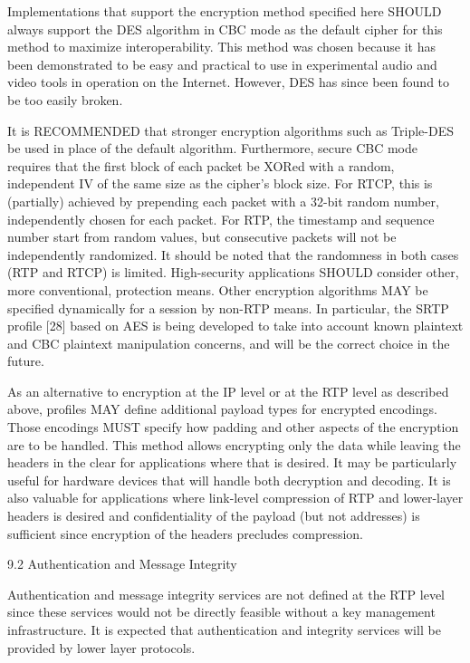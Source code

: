 \documentclass{article}
\begin{document}
Implementations that support the encryption method specified here SHOULD always support the DES algorithm in CBC mode as the default cipher for this method to maximize interoperability.  This method was chosen because it has been demonstrated to be easy and practical to use in experimental audio and video tools in operation on the Internet.  However, DES has since been found to be too easily broken.

It is RECOMMENDED that stronger encryption algorithms such as Triple-DES be used in place of the default algorithm.  Furthermore, secure CBC mode requires that the first block of each packet be XORed with a random, independent IV of the same size as the cipher's block size.  For RTCP, this is (partially) achieved by prepending each packet with a 32-bit random number, independently chosen for each packet.  For RTP, the timestamp and sequence number start from random values, but consecutive packets will not be independently randomized. It should be noted that the randomness in both cases (RTP and RTCP) is limited.  High-security applications SHOULD consider other, more conventional, protection means.  Other encryption algorithms MAY be specified dynamically for a session by non-RTP means.  In particular, the SRTP profile [28] based on AES is being developed to take into account known plaintext and CBC plaintext manipulation concerns, and will be the correct choice in the future.

As an alternative to encryption at the IP level or at the RTP level as described above, profiles MAY define additional payload types for encrypted encodings.  Those encodings MUST specify how padding and other aspects of the encryption are to be handled.  This method allows encrypting only the data while leaving the headers in the clear for applications where that is desired.  It may be particularly useful for hardware devices that will handle both decryption and decoding.  It is also valuable for applications where link-level compression of RTP and lower-layer headers is desired and confidentiality of the payload (but not addresses) is sufficient since encryption of the headers precludes compression.

9.2 Authentication and Message Integrity

Authentication and message integrity services are not defined at the RTP level since these services would not be directly feasible without a key management infrastructure.  It is expected that authentication and integrity services will be provided by lower layer protocols.
\end{document}
